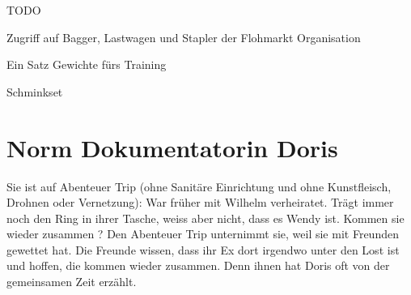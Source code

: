 \begin{npcBox}[title=Wendy]
    \begin{stressSection}
    \end{stressSection}
    \begin{tabularx}{\textwidth}{ XX }
    \end{tabularx}

    \begin{consequences}
    \item {}
    \item {}
    \item {}
    \end{consequences}

    \begin{npcDescription}
    TODO
    \end{npcDescription}


    \begin{equipment}
    \item Zugriff auf Bagger, Lastwagen und Stapler der Flohmarkt Organisation
    \item Ein Satz Gewichte fürs Training
    \item Schminkset
    \end{equipment}
\end{npcBox}
\newpage

\section{Norm Dokumentatorin Doris}

Sie ist auf Abenteuer Trip (ohne Sanitäre Einrichtung und ohne Kunstfleisch, Drohnen oder Vernetzung): War früher mit Wilhelm verheiratet. Trägt immer noch den Ring in ihrer Tasche, weiss aber nicht, dass es Wendy ist. Kommen sie wieder zusammen ?
Den Abenteuer Trip unternimmt sie, weil sie mit Freunden gewettet hat. Die Freunde wissen, dass ihr Ex dort irgendwo unter den Lost ist und hoffen, die kommen wieder zusammen. Denn ihnen hat Doris oft von der gemeinsamen Zeit erzählt.

